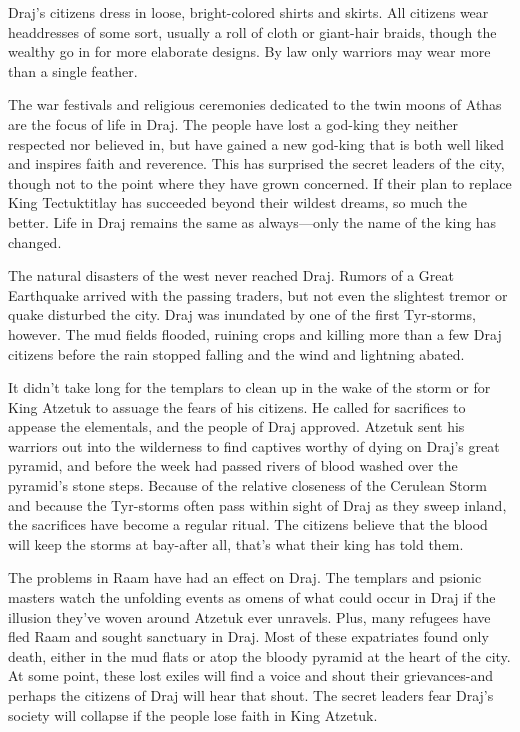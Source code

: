 {
	Draj's citizens dress in loose, bright-colored shirts and skirts. All citizens wear headdresses of some sort, usually a roll of cloth or giant-hair braids, though the wealthy go in for more elaborate designs. By law only warriors may wear more than a single feather.

	The war festivals and religious ceremonies dedicated to the twin moons of Athas are the focus of life in Draj. The people have lost a god-king they neither respected nor believed in, but have gained a new god-king that is both well liked and inspires faith and reverence. This has surprised the secret leaders of the city, though not to the point where they have grown concerned. If their plan to replace King Tectuktitlay has succeeded beyond their wildest dreams, so much the better. Life in Draj remains the same as always---only the name of the king has changed.

	The natural disasters of the west never reached Draj. Rumors of a Great Earthquake arrived with the passing traders, but not even the slightest tremor or quake disturbed the city. Draj was inundated by one of the first Tyr-storms, however. The mud fields flooded, ruining crops and killing more than a few Draj citizens before the rain stopped falling and the wind and lightning abated.

	It didn't take long for the templars to clean up in the wake of the storm or for King Atzetuk to assuage the fears of his citizens. He called for sacrifices to appease the elementals, and the people of Draj approved. Atzetuk sent his warriors out into the wilderness to find captives worthy of dying on Draj's great pyramid, and before the week had passed rivers of blood washed over the pyramid's stone steps. Because of the relative closeness of the Cerulean Storm and because the Tyr-storms often pass within sight of Draj as they sweep inland, the sacrifices have become a regular ritual. The citizens believe that the blood will keep the storms at bay-after all, that's what their king has told them.

	The problems in Raam have had an effect on Draj. The templars and psionic masters watch the unfolding events as omens of what could occur in Draj if the illusion they've woven around Atzetuk ever unravels. Plus, many refugees have fled Raam and sought sanctuary in Draj. Most of these expatriates found only death, either in the mud flats or atop the bloody pyramid at the heart of the city. At some point, these lost exiles will find a voice and shout their grievances-and perhaps the citizens of Draj will hear that shout. The secret leaders fear Draj's society will collapse if the people lose faith in King Atzetuk.

}
